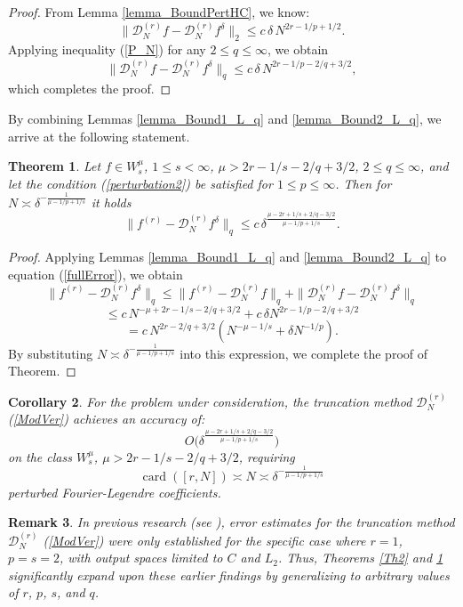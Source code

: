 \documentclass[10pt]{extarticle}
\DeclareMathOperator{\card}{card}
\newtheorem{theorem}{Theorem}[section]
\newtheorem{corollary}[theorem]{Corollary}
\newtheorem{remark}[theorem]{Remark}
\begin{document}
\begin{proof}
From Lemma \ref{lemma_BoundPertHC}, we know:
$$
\|\mathcal{D}^{(r)}_N f - \mathcal{D}^{(r)}_N f^\delta\|_{2}
\leq c\,\delta\, N^{2r-1/p+1/2} .
$$
Applying inequality (\ref{P_N}) for any $2\le q\le \infty$, we obtain
$$
\|\mathcal{D}^{(r)}_N f - \mathcal{D}^{(r)}_N f^\delta\|_{q}
\leq c\, \delta\, N^{2r-1/p-2/q+3/2} ,
$$
which completes the proof.
\end{proof}

By combining Lemmas \ref{lemma_Bound1_L_q} and \ref{lemma_Bound2_L_q}, we arrive at the following statement.

\begin{theorem} \label{Th1_L_q}
Let $f\in W^\mu_{s}$, $1\leq s< \infty$, $\mu>2r-1/s-2/q+3/2$, $2\leq q\le \infty$, and
let the condition (\ref{perturbation2}) be satisfied for $1\le p\le \infty$.
Then for $N\asymp \delta^{-\frac{1}{\mu-1/p+1/s}}$ it holds
$$
\|f^{(r)} - \mathcal{D}^{(r)}_N f^\delta\|_{q}
\leq c\, \delta^{\frac{\mu-2r+1/s+2/q-3/2}{\mu-1/p+1/s}} .
$$
\end{theorem}

\begin{proof}
Applying Lemmas \ref{lemma_Bound1_L_q} and \ref{lemma_Bound2_L_q} to equation (\ref{fullError}), we obtain
$$
\|f^{(r)} - \mathcal{D}^{(r)}_N f^\delta\|_{q}
\leq \|f^{(r)}-\mathcal{D}_N^{(r)} f\|_{q} +
\|\mathcal{D}^{(r)}_N f - \mathcal{D}^{(r)}_N f^\delta\|_{q}
$$
$$
\leq c\, N^{-\mu+2r-1/s-2/q+3/2} + c\, \delta N^{2r-1/p-2/q+3/2}
$$
$$
= c\, N^{2r-2/q+3/2} \left(N^{-\mu-1/s} + \delta N^{-1/p}\right) .
$$
By substituting $N\asymp \delta^{-\frac{1}{\mu-1/p+1/s}}$ into this expression, we complete the proof of Theorem.
\end{proof}

\begin{corollary} \label{Cor3}
For the problem under consideration, the truncation method $\mathcal{D}^{(r)}_{N}$ (\ref{ModVer}) achieves an accuracy of:
$$
O\Big(\delta^{\frac{\mu-2r+1/s+2/q-3/2}{\mu-1/p+1/s}}\Big)
$$
on the class $W^{\mu}_{s}$, $\mu>2r-1/s-2/q+3/2$, requiring
$$
\card([r,N]) \asymp
N \asymp \delta^{-\frac{1}{\mu-1/p+1/s}}
$$
perturbed Fourier-Legendre coefficients.
\end{corollary}

\begin{remark} \label{comp1}
In previous research (see \cite{Lu&Naum&Per}), error estimates for the truncation method
$\mathcal{D}^{(r)}_{N}$ (\ref{ModVer}) were only established for the specific case where $r=1$, $p=s=2$,
with output spaces limited to $C$ and $L_{2}$.
Thus, Theorems \ref{Th2} and \ref{Th1_L_q} significantly expand upon these earlier findings by generalizing
to arbitrary values of $r$, $p$, $s$, and $q$.
\end{remark}
\end{document}
